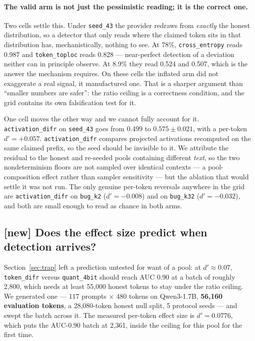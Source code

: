 \documentclass[11pt]{article}
\newcommand{\td}{\texttt{token\_difr}}
\newcommand{\ce}{\texttt{cross\_entropy}}
\newcommand{\ad}{\texttt{activation\_difr}}
\newcommand{\tl}{\texttt{token\_toploc}}
\begin{document}
\paragraph{The valid arm is not just the pessimistic reading; it is the correct
one.} Two cells settle this. Under \texttt{seed\_43} the provider redraws from
\emph{exactly} the honest distribution, so a detector that only reads where the
claimed token sits in that distribution has, mechanistically, nothing to see. At
78\%, \ce{} reads 0.987 and \tl{} reads 0.828 --- near-perfect detection of a
deviation neither can in principle observe. At 8.9\% they read 0.524 and 0.507,
which is the answer the mechanism requires. On these cells the inflated arm did not
exaggerate a real signal, it manufactured one. That is a sharper argument than
``smaller numbers are safer'': the ratio ceiling is a correctness condition, and
the grid contains its own falsification test for it.

One cell moves the other way and we cannot fully account for it. \ad{} on
\texttt{seed\_43} goes from 0.499 to $0.575 \pm 0.021$, with a per-token
$d' = +0.057$. \ad{} compares projected activations recomputed on the same claimed
prefix, so the seed should be invisible to it. We attribute the residual to the
honest and re-seeded pools containing different \emph{text}, so the two
nondeterminism floors are not sampled over identical contexts --- a pool-composition
effect rather than sampler sensitivity --- but the ablation that would settle it was
not run. The only genuine per-token reversals anywhere in the grid are \ad{} on
\texttt{bug\_k2} ($d' = -0.008$) and on \texttt{bug\_k32} ($d' = -0.032$), and both
are small enough to read as chance in both arms.

\subsection{[new] Does the effect size predict when detection arrives?}
\label{sec:poolscaling}

Section~\ref{sec:trap} left a prediction untested for want of a pool: at
$d' \approx 0.07$, \td{} versus \texttt{quant\_4bit} should reach AUC 0.90 at a
batch of roughly 2{,}800, which needs at least 55{,}000 honest tokens to stay under
the ratio ceiling. We generated one --- 117 prompts $\times$ 480 tokens on
Qwen3-1.7B, \textbf{56{,}160 evaluation tokens}, a 28{,}080-token honest null split,
5 protocol seeds --- and swept the batch across it. The measured per-token effect
size is $d' = 0.0776$, which puts the AUC-0.90 batch at 2{,}361, inside the ceiling
for this pool for the first time.
\end{document}

